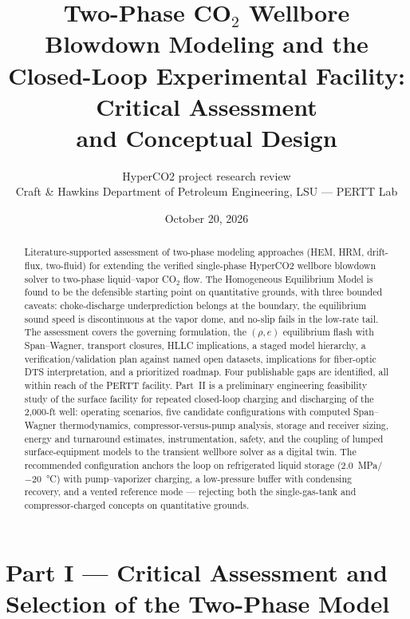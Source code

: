 \documentclass[11pt]{article}
\title{Two-Phase CO$_2$ Wellbore Blowdown Modeling and the\\
Closed-Loop Experimental Facility: Critical Assessment\\
and Conceptual Design}
\author{HyperCO2 project research review\\
\small Craft \& Hawkins Department of Petroleum Engineering, LSU ---
PERTT Lab}
\date{October 20, 2026}
\begin{document}
\maketitle

\begin{abstract}
\noindent Literature-supported assessment of two-phase modeling
approaches (HEM, HRM, drift-flux, two-fluid) for extending the
verified single-phase HyperCO2 wellbore blowdown solver to two-phase
liquid--vapor CO$_2$ flow. The Homogeneous Equilibrium Model is found
to be the defensible starting point on quantitative grounds, with
three bounded caveats: choke-discharge underprediction belongs at the
boundary, the equilibrium sound speed is discontinuous at the vapor
dome, and no-slip fails in the low-rate tail. The assessment covers
the governing formulation, the $(\rho,e)$ equilibrium flash with
Span--Wagner, transport closures, HLLC implications, a staged model
hierarchy, a verification/validation plan against named open
datasets, implications for fiber-optic DTS interpretation, and a
prioritized roadmap. Four publishable gaps are identified, all within
reach of the PERTT facility. Part~II is a preliminary engineering
feasibility study of the surface facility for repeated closed-loop
charging and discharging of the 2,000-ft well: operating scenarios,
five candidate configurations with computed Span--Wagner
thermodynamics, compressor-versus-pump analysis, storage and receiver
sizing, energy and turnaround estimates, instrumentation, safety, and
the coupling of lumped surface-equipment models to the transient
wellbore solver as a digital twin. The recommended configuration
anchors the loop on refrigerated liquid storage
(\SI{2.0}{MPa}/\SI{-20}{\celsius}) with pump--vaporizer charging, a
low-pressure buffer with condensing recovery, and a vented reference
mode --- rejecting both the single-gas-tank and compressor-charged
concepts on quantitative grounds.
\end{abstract}

\tableofcontents
\clearpage

\part*{Part I --- Critical Assessment and Selection of the Two-Phase
Model}



\clearpage




\end{document}
